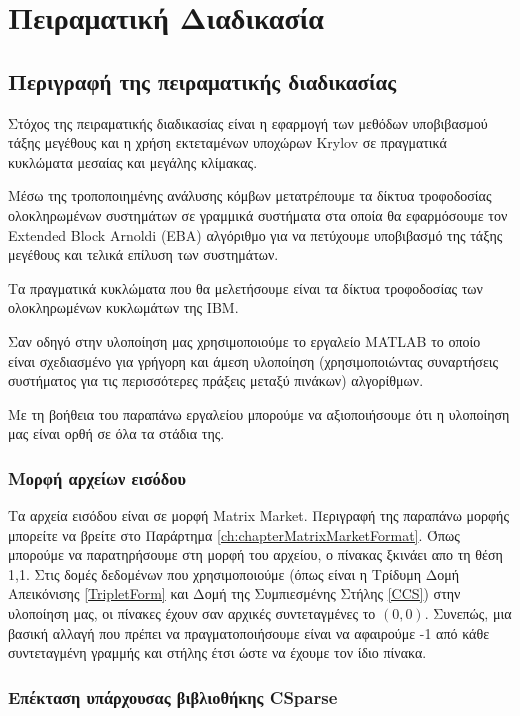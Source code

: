 ﻿
\chapter{Πειραματική Διαδικασία}
\label{ch:6.chapterImplementation}

\section{Περιγραφή της πειραματικής διαδικασίας}
Στόχος της πειραματικής διαδικασίας είναι η εφαρμογή των μεθόδων υποβιβασμού τάξης μεγέθους και η χρήση εκτεταμένων υποχώρων \textlatin{Krylov} σε πραγματικά κυκλώματα μεσαίας και μεγάλης κλίμακας. 

Μέσω της τροποποιημένης ανάλυσης κόμβων μετατρέπουμε τα δίκτυα τροφοδοσίας ολοκληρωμένων συστημάτων σε γραμμικά συστήματα στα οποία θα εφαρμόσουμε τον \textlatin{Extended Block Arnoldi (EBA)} αλγόριθμο για να πετύχουμε υποβιβασμό της τάξης μεγέθους και τελικά επίλυση των συστημάτων.

Τα πραγματικά κυκλώματα που θα μελετήσουμε είναι τα δίκτυα τροφοδοσίας των ολοκληρωμένων κυκλωμάτων της ΙΒΜ.

Σαν οδηγό στην υλοποίηση μας χρησιμοποιούμε το εργαλείο \textlatin{MATLAB} το οποίο είναι σχεδιασμένο για γρήγορη και άμεση υλοποίηση (χρησιμοποιώντας συναρτήσεις συστήματος για τις περισσότερες πράξεις μεταξύ πινάκων) αλγορίθμων.

Με τη βοήθεια του παραπάνω εργαλείου μπορούμε να αξιοποιήσουμε ότι η υλοποίηση μας είναι ορθή σε όλα τα στάδια της.

\subsection{Μορφή αρχείων εισόδου}
Τα αρχεία εισόδου είναι σε μορφή \textlatin{Matrix Market}. Περιγραφή της παραπάνω μορφής μπορείτε να βρείτε στο Παράρτημα \ref{ch:chapterMatrixMarketFormat}. Όπως μπορούμε να παρατηρήσουμε στη μορφή του αρχείου, ο πίνακας ξκινάει απο τη θέση 1,1. Στις δομές δεδομένων που χρησιμοποιούμε (όπως είναι η Τρίδυμη Δομή Απεικόνισης \ref{TripletForm} και Δομή της Συμπιεσμένης Στήλης \ref{CCS}) στην υλοποίηση μας, οι πίνακες έχουν σαν αρχικές συντεταγμένες το $(0,0)$. Συνεπώς, μια βασική αλλαγή που πρέπει να πραγματοποιήσουμε είναι να αφαιρούμε -1 από κάθε συντεταγμένη γραμμής και στήλης έτσι ώστε να έχουμε τον ίδιο πίνακα.

\subsection{Επέκταση υπάρχουσας βιβλιοθήκης \textlatin{CSparse}}

